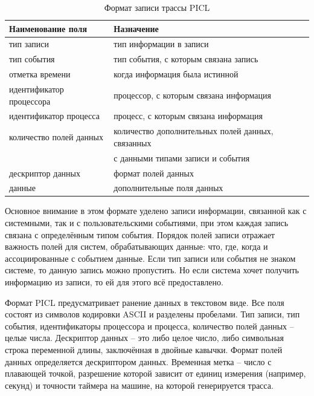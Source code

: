 \begin{table}[h!]
	\caption{\label{tab:tbl1}Формат записи трассы PICL}
\begin{tabular}{|l|l|}
	\hline
	Наименование поля & Назначение \\
	\hline\hline
	тип записи&тип информации в записи
	\\\hline
	тип события &тип события, с которым связана запись
	\\\hline
	отметка времени&когда информация была истинной\\\hline
	идентификатор процессора
	&процессор, с которым связана информация
	\\\hline
	идентификатор процесса	
	&процесс, с которым связана информация	
	\\\hline
	количество полей данных	
	&количество дополнительных полей данных, связанных \tabularnewline & с данными типами записи и события	
	\\\hline
	дескриптор данных	
	&формат полей данных
    \\\hline
    данные	
    &дополнительные поля данных
    \\\hline

\end{tabular}
\end{table}
Основное внимание в этом формате уделено записи информации, связанной как с системными, так и с пользовательскими событиями, при этом каждая запись связана с определённым типом события. Порядок полей записи отражает важность полей для систем, обрабатывающих данные: что, где, когда и ассоциированные с событием данные. Если тип записи или события не знаком системе, то данную запись можно пропустить. Но если система хочет получить информацию из записи, то ей для этого всё предоставлено.

Формат PICL предусматривает ранение данных в текстовом виде. Все поля состоят из символов кодировки ASCII и разделены пробелами. Тип записи, тип события, идентификаторы процессора и процесса, количество полей данных – целые числа. Дескриптор данных – это либо целое число, либо символьная строка переменной длины, заключённая в двойные кавычки. Формат полей данных определяется дескриптором данных. Временная метка – число с плавающей точкой, разрешение которой зависит от единиц измерения (например, секунд) и точности таймера на машине, на которой генерируется трасса.

